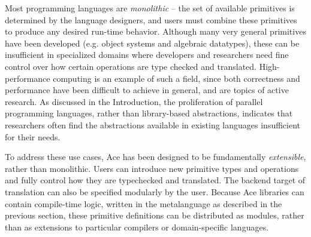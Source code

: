 \documentclass{sig-alternate}
\begin{document}
Most programming languages are {\em monolithic} -- the set of available primitives is determined by the language designers, and users must combine these primitives to produce any desired run-time behavior. Although many very general primitives have been developed (e.g. object systems and algebraic datatypes), these can be insufficient in specialized domains where developers and researchers need fine control over how certain operations are type checked and translated. High-performance computing is an example of such a field, since both correctness and performance have been difficult to achieve in general, and are topics of active research. As discussed in the Introduction, the proliferation of parallel programming languages, rather than library-based abstractions, indicates that researchers often find the abstractions available in existing languages insufficient for their needs.

To address these use cases, Ace has been designed to be fundamentally {\em extensible}, rather than monolithic. Users can introduce new primitive types and operations and fully control how they are typechecked and translated. The backend target of translation can also be specified modularly by the user. Because Ace libraries can contain compile-time logic, written in the metalanguage as described in the previous section, these primitive definitions can be distributed as modules, rather than as extensions to particular compilers or domain-specific languages.
\end{document}
